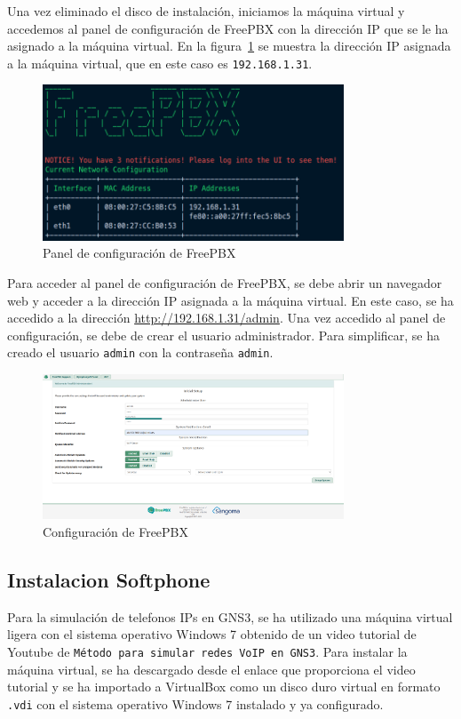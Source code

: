 \noindent
Una vez eliminado el disco de instalación, iniciamos la máquina virtual y accedemos al panel de configuración de FreePBX con la dirección IP que se le ha asignado a la máquina virtual. En la figura~\ref{fig:freepbx_terminal.png} se muestra la dirección IP asignada a la máquina virtual, que en este caso es \texttt{192.168.1.31}.
\begin{figure}[H]
	\centering
	\includegraphics[width=0.8\textwidth]{images/freepbx_terminal.png}
	\caption{Panel de configuración de FreePBX}
	\label{fig:freepbx_terminal.png}
\end{figure}

\noindent
Para acceder al panel de configuración de FreePBX, se debe abrir un navegador web y acceder a la dirección IP asignada a la máquina virtual. En este caso, se ha accedido a la dirección 
\url{http://192.168.1.31/admin}. Una vez accedido al panel de configuración, se debe de crear el usuario administrador. Para simplificar, se ha creado el usuario \texttt{admin} con la contraseña \texttt{admin}.

\begin{figure}[H]
	\centering
	\includegraphics[width=0.8\textwidth]{images/freepbx_configuration_admin.png}
	\caption{Configuración de FreePBX}
	\label{fig:freepbx_configuration_admin}
\end{figure}

\subsection{Instalacion Softphone}
\label{Apendice1:instalacion_softphone}
Para la simulación de telefonos IPs en GNS3, se ha utilizado una máquina virtual ligera con el sistema operativo Windows 7 obtenido de un video tutorial de Youtube \cite{youtube_carlos_carrillo} de \texttt{Método para simular redes VoIP en GNS3}. Para instalar la máquina virtual, se ha descargado desde el enlace que proporciona el video tutorial y se ha importado a VirtualBox como un disco duro virtual en formato \texttt{.vdi} con el sistema operativo Windows 7 instalado y ya configurado.


